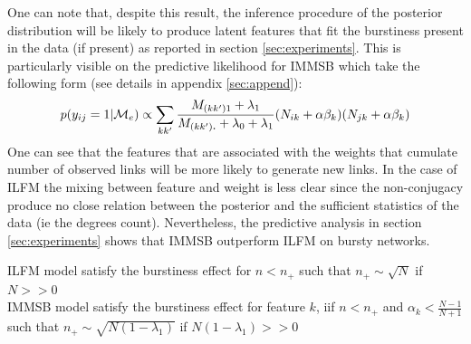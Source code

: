 One can note that, despite this result, the inference procedure of the posterior distribution will be likely to produce latent features that fit  the burstiness present in the data (if present) as reported in section \ref{sec:experiments}. This is particularly visible on the predictive likelihood for IMMSB which take the following form (see details in appendix \ref{sec:append}):
\begin{equation*} \label{eq:ppp}
p(y_{ij}=1 | \M_e)\propto \sum_{kk'} \frac{M_{(kk')1} + \lambda_1}{M_{(kk')\bm{.}} + \lambda_0 + \lambda_1}  (N_{ik} + \alpha\beta_k ) (N_{jk} + \alpha\beta_k)
\end{equation*}   
One can see that the features that are associated with the weights that cumulate number of observed links will be more likely to generate new links. In the case of ILFM the mixing between feature and weight is less clear since the non-conjugacy produce no close relation between the posterior and the sufficient statistics of the data (ie the degrees count). Nevertheless, the predictive analysis in section \ref{sec:experiments} shows that IMMSB outperform ILFM on bursty networks.

\begin{proposition} \label{prop:diaconis}
    ILFM model satisfy the burstiness effect for $n<n_+$ such that $n_+ \sim \sqrt{N}$  if $N>>0$ \\
    IMMSB model satisfy the burstiness effect for feature $k$, iif $n<n_+$ and $\alpha_k<\frac{N-1}{N+1}$ such that $n_+ \sim \sqrt{N(1-\lambda_1)}$ if $N(1-\lambda_1)>>0$ 
\end{proposition}

